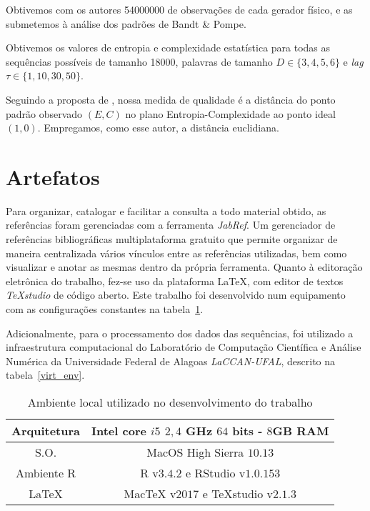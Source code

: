Obtivemos com os autores \num{54000000} de observações de cada gerador físico, e as submetemos à análise dos padrões de Bandt \& Pompe.

Obtivemos os valores de entropia e complexidade estatística para todas as sequências possíveis de tamanho \num{18000}, palavras de tamanho $D\in\{3, 4, 5, 6\}$ e \textit{lag} $\tau\in\{1, 10, 30,50\}$.

Seguindo a proposta de \citet{NewPermutationEntropy}, nossa medida de qualidade é a distância do ponto padrão observado $(E,C)$ no plano Entropia-Complexidade ao ponto ideal $(1,0)$.
Empregamos, como esse autor, a distância euclidiana.


\section{Artefatos}Para organizar, catalogar e facilitar a consulta a todo material obtido, as referências foram gerenciadas com a ferramenta \emph{JabRef}. Um gerenciador de referências bibliográficas multiplataforma gratuito que permite organizar de maneira centralizada vários vínculos entre as referências utilizadas, bem como visualizar e anotar as mesmas dentro da própria ferramenta. Quanto à editoração eletrônica do trabalho, fez-se uso da plataforma \LaTeX, com editor de textos \emph{TeXstudio} de código aberto. Este trabalho foi desenvolvido num equipamento com as configurações constantes na tabela~\ref{local_env}.

Adicionalmente, para o processamento dos dados das sequências, foi utilizado a infraestrutura computacional do Laboratório de Computação Científica e Análise Numérica da Universidade Federal de Alagoas \textit{LaCCAN-UFAL}, descrito na tabela~\ref{virt_env}.

\begin{table}[hbt]
\centering
\caption{Ambiente local utilizado no desenvolvimento do trabalho}\label{local_env}
\begin{tabular}{c|c}
	\toprule
	Arquitetura & Intel core $i5$ $2,4$ GHz $64$ bits - $8$GB RAM\\
	\midrule
	S.O. & MacOS High Sierra $10.13$ \\
	\midrule
	Ambiente R & R v$3.4.2$ e RStudio v$1.0.153$\\
	\midrule
	\LaTeX & MacTeX v$2017$ e TeXstudio v$2.1.3$\\
	\bottomrule
\end{tabular}
\end{table}


